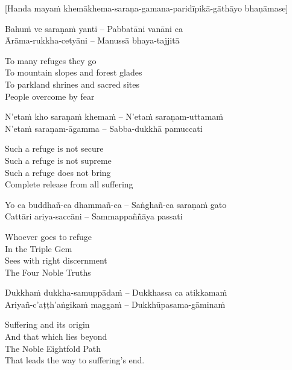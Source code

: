 \begin{center}
  [Handa mayaṁ khemākhema-saraṇa-gamana-paridīpikā-gāthāyo bhaṇāmase]
\end{center}

Bahuṁ ve saraṇaṁ yanti – Pabbatāni vanāni ca\\
Ārāma-rukkha-cetyāni – Manussā bhaya-tajjitā\\

\begin{english}
  To many refuges they go\\
  To mountain slopes and forest glades\\
  To parkland shrines and sacred sites\\
  People overcome by fear
\end{english}

N'etaṁ kho saraṇaṁ khemaṁ – N'etaṁ saraṇam-uttamaṁ\\
N'etaṁ saraṇam-āgamma – Sabba-dukkhā pamuccati\\

\begin{english}
  Such a refuge is not secure\\
  Such a refuge is not supreme\\
  Such a refuge does not bring\\
  Complete release from all suffering
\end{english}

Yo ca buddhañ-ca dhammañ-ca – Saṅghañ-ca saraṇaṁ gato\\
Cattāri ariya-saccāni – Sammappaññāya passati\\

\begin{english}
  Whoever goes to refuge\\
  In the Triple Gem\\
  Sees with right discernment\\
  The Four Noble Truths
\end{english}

Dukkhaṁ dukkha-samuppādaṁ – Dukkhassa ca atikkamaṁ\\
Ariyañ-c'aṭṭh'aṅgikaṁ maggaṁ – Dukkhūpasama-gāminaṁ\\

\begin{english}
  Suffering and its origin\\
  And that which lies beyond\\
  The Noble Eightfold Path\\
  That leads the way to suffering's end.
\end{english}

